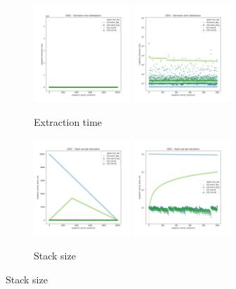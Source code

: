 \begin{figure}
    \begin{subfigure}[b]{\textwidth}
        \centering
        \includegraphics[width=0.40\textwidth]{./fragments/04_experimental_execution/images/02_basebenchmark_03_sort_d_case.png.1_0.png}
        \includegraphics[width=0.40\textwidth]{./fragments/04_experimental_execution/images/02_basebenchmark_03_sort_d_case.png.1_1.png}
        \caption{Extraction time}
        \label{FIG:PARTITION_SCHEME_01_DESCENDING__0_0}
    \end{subfigure}

    \begin{subfigure}[b]{\textwidth}
        \centering
        \includegraphics[width=0.40\textwidth]{./fragments/04_experimental_execution/images/02_basebenchmark_03_sort_d_case.png.2_0.png}
        \includegraphics[width=0.40\textwidth]{./fragments/04_experimental_execution/images/02_basebenchmark_03_sort_d_case.png.2_1.png}
        \caption{Stack size}
        \label{FIG:PARTITION_SCHEME_01_DESCENDING__0_0}
    \end{subfigure}
    

\end{figure}
